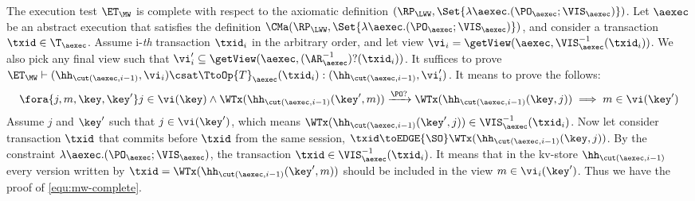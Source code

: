 The execution test $\ET_{\MW}$ is complete with respect to 
the axiomatic definition $(\RP_{\LWW}, \Set{\lambda \aexec.(\PO_{\aexec} ; \VIS_{\aexec})})$. 
Let $\aexec$ be an abstract execution that satisfies the definition
$\CMa(\RP_{\LWW}, \Set{\lambda \aexec.(\PO_{\aexec} ; \VIS_{\aexec})})$, 
and consider a transaction $\txid \in \T_{\aexec}$. 
Assume i-\emph{th} transaction \( \txid_i \) in the arbitrary order,
and let view \( \vi_{i} = \getView(\aexec, \VIS^{-1}_{\aexec}(\txid_{i}) ) \).
We also pick any final view such that \( \vi'_{i} \subseteq \getView(\aexec, (\AR^{-1}_{\aexec})?(\txid_{i}) ) \).
It suffices to prove \( \ET_\MW \vdash (\hh_{\cut(\aexec, i-1)}, \vi_i ) \csat  \TtoOp{T}_{\aexec}(\txid_{i}) : (\hh_{\cut(\aexec, i-1)}, \vi'_{i}) \).
It means to prove the follows:
\begin{equation}
\label{equ:mw-complete}
\begin{array}{@{}l@{}}
    \fora{j,m,\key, \key' } j \in \vi(\key)  
    \wedge \WTx(\hh_{\cut(\aexec, i-1)}(\key', m)) \xrightarrow{\PO?} \WTx(\hh_{\cut(\aexec, i-1)}(\key, j))  
    \implies m \in \vi(\key')
\end{array}
\end{equation}
Assume \( j \) and \( \key' \) such that \( j \in \vi(\key')\), which means \( \WTx(\hh_{\cut(\aexec, i-1)}(\key', j)) \in \VIS^{-1}_{\aexec}(\txid_{i}) \).
Now let consider transaction \( \txid \) that commits before \( \txid \) from the same session, \ie \( \txid \toEDGE{\SO} \WTx(\hh_{\cut(\aexec, i-1)}(\key, j)) \).
By the constraint \( \lambda \aexec.(\PO_{\aexec} ; \VIS_{\aexec}) \), the transaction \( \txid \in \VIS^{-1}_{\aexec}(\txid_{i}) \).
It means that in the kv-store \(  \hh_{\cut(\aexec, i-1)} \) every version written by \( \txid =  \WTx(\hh_{\cut(\aexec, i-1)}(\key', m)) \) should be included in the view \( m \in \vi_i(\key') \).
Thus we have the proof of \cref{equ:mw-complete}.
